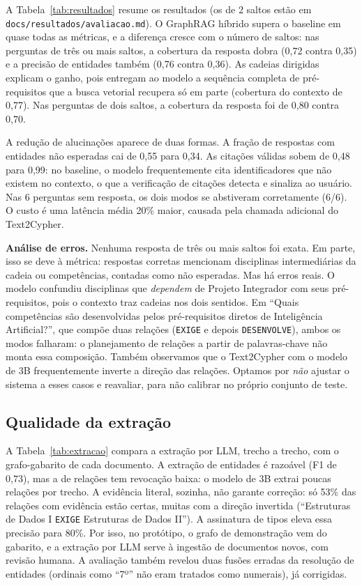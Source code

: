 \documentclass[12pt]{article}
\begin{document}
A Tabela~\ref{tab:resultados} resume os resultados (os de 2 saltos estão em
\texttt{docs/resultados/avaliacao.md}). O GraphRAG híbrido supera o baseline em quase todas
as métricas, e a diferença cresce com o número de saltos: nas perguntas de três ou mais
saltos, a cobertura da resposta dobra (0,72 contra 0,35) e a precisão de entidades
também (0,76 contra 0,36). As cadeias dirigidas explicam o ganho, pois entregam ao modelo
a sequência completa de pré-requisitos que a busca vetorial recupera só em parte (cobertura
do contexto de 0,77). Nas perguntas de dois saltos, a cobertura da resposta foi de 0,80
contra 0,70.

A redução de alucinações aparece de duas formas. A fração de respostas com entidades
não esperadas cai de 0,55 para 0,34. As citações válidas sobem de 0,48 para 0,99: no
baseline, o modelo frequentemente cita identificadores que não existem no contexto, o
que a verificação de citações detecta e sinaliza ao usuário. Nas 6 perguntas sem
resposta, os dois modos se abstiveram corretamente (6/6). O custo é uma latência
média 20\% maior, causada pela chamada adicional do Text2Cypher.

\textbf{Análise de erros.} Nenhuma resposta de três ou mais saltos foi exata. Em parte,
isso se deve à métrica: respostas corretas mencionam disciplinas intermediárias da
cadeia ou competências, contadas como não esperadas. Mas há erros reais. O modelo
confundiu disciplinas que \emph{dependem} de Projeto Integrador com seus pré-requisitos,
pois o contexto traz cadeias nos dois sentidos. Em ``Quais competências são desenvolvidas
pelos pré-requisitos diretos de Inteligência Artificial?'', que compõe duas relações
(\texttt{EXIGE} e depois \texttt{DESENVOLVE}), ambos os modos falharam: o planejamento de
relações a partir de palavras-chave não monta essa composição. Também observamos que o
Text2Cypher com o modelo de 3B frequentemente inverte a direção das relações. Optamos por
\emph{não} ajustar o sistema a esses casos e reavaliar, para não calibrar no próprio
conjunto de teste.

\subsection{Qualidade da extração}

A Tabela~\ref{tab:extracao} compara a extração por LLM, trecho a trecho, com o
grafo-gabarito de cada documento. A extração de entidades é razoável (F1 de 0,73), mas a
de relações tem revocação baixa: o modelo de 3B extrai poucas relações por trecho. A
evidência literal, sozinha, não garante correção: só 53\% das relações com evidência estão
certas, muitas com a direção invertida (``Estruturas de Dados I \texttt{EXIGE} Estruturas
de Dados II''). A assinatura de tipos eleva essa precisão para 80\%. Por isso, no
protótipo, o grafo de demonstração vem do gabarito, e a extração por LLM serve à
ingestão de documentos novos, com revisão humana. A avaliação também revelou duas fusões
erradas da resolução de entidades (ordinais como ``7º'' não eram tratados como
numerais), já corrigidas.
\end{document}
